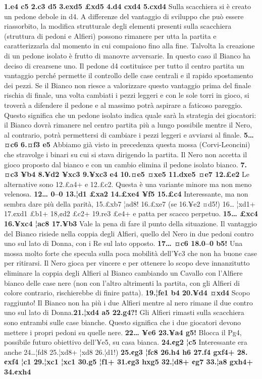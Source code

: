 \textbf{1.e4 c5 2.c3 d5 3.exd5 £xd5 4.d4 cxd4 5.cxd4} Sulla scacchiera
si è creato un pedone debole in d4. A differenze del vantaggio di
sviluppo che può essere riassorbito, la modifica strutturale degli
elementi presenti sulla scacchiera (struttura di pedoni e Alfieri)
possono rimanere per utta la partita e caratterizzarla dal momento in
cui compaiono fino alla fine. Talvolta la creazione di un pedone isolato
è frutto di manovre avversarie. In questo caso il Bianco ha deciso di
crearsene uno. Il pedone d4 costituisce per tutto il centro partita un
vantaggio perché permette il controllo delle case centrali e il rapido
spostamento dei pezzi. Se il Bianco non riesce a valorizzare questo
vantaggio prima del finale rischia di finale, una volta cambiati i pezzi
leggeri e con le sole torri in gioco, si troverà a difendere il pedone e
al massimo potrà aspirare a faticoso pareggio. Questo significa che un
pedone isolato indica quale sarà la strategia dei giocatori: il Bianco
dovrà rimanere nel centro partita più a lungo possibile mentre il Nero,
al contrario, potrà permettersi di cambiare i pezzi leggeri e avviarsi
al finale. \textbf{5\ldots ¤c6 6.¤f3 e5} Abbiamo già visto in precedenza
questa mossa (Corvi-Leoncini) che stravolge i binari su cui si stava
dirigendo la partita. Il Nero non accetta il gioco proposto dal bianco e
con un cambio elimina il pedone isolato bianco. \textbf{7.¤c3 ¥b4 8.¥d2
¥xc3 9.¥xc3 e4 10.¤e5 ¤xe5 11.dxe5 ¤e7 12.£e2} Le alternative sono
12.£a4+ e 12.£c2. Questa è una variante minore ma non meno velenosa.
\textbf{12\ldots{} 0--0 13.¦d1 £xa2 14.£xe4 ¥f5 15.£c4} Interessante, ma
non sembra dare più della parità, 15.£xb7 ¦ad8! 16.£xe7 (se 16.¥e2 ¤d5!)
16\ldots{} ¦xd1+ 17.¢xd1 £b1+ 18,¢d2 £c2+ 19.re3 £e4+ e patta per scacco
perpetuo. \textbf{15\ldots{} £xc4 16.¥xc4 ¦ac8 17.¥b3} Vale la pena di
fare il punto della situazione. Il vantaggio del Bianco risiede nella
coppia degli Alfieri, quello del Nero in due pedoni contro uno sul lato
di Donna, con i Re sul lato opposto. \textbf{17\ldots{} ¤c6 18.0--0 b5!}
Una mossa molto forte che specula sulla poca mobilità dell'¥c3 che non
ha buone case per ritirarsi. Il Nero gioca per vincere e per ottenere lo
scopo deve innanzitutto eliminare la coppia degli Alfieri al Bianco
cambiando un Cavallo con l'Alfiere bianco delle case nere (non con
l'altro altrimenti la partita, con gli Alfieri di colore contrario,
rischierebbe di finire patta). \textbf{19.¦fe1 b4 20.¥d4 ¤xd4} Scopo
raggiunto! Il Bianco non ha più i due Alfieri mentre al nero rimane il
due contro uno sul lato di Donna.\textbf{21.¦xd4 a5 22.g4?!} Gli Alfieri
rimasti sulla scacchiera sono entrambi sulle case bianche. Questo
significa che i due giocatori devono mettere i propri pedoni su quelle
nere. \textbf{22\ldots{} ¥e6 23.¥a4 g5!} Blocca il Pg4, possibile futuro
obiettivo dell'¥e5, su casa bianca. \textbf{24.¢g2 ¦c5} Interessante era
anche 24\ldots ¦fd8 25.¦xd8+ ¦xd8 26.¦d1!) \textbf{25.¢g3 ¦fc8 26.h4 h6
27.f4 gxf4+ 28.¢xf4 ¦c1 29.¦xc1 ¦xc1 30.g5 ¦f1+ 31.¢g3 hxg5 32.¦d8+ ¢g7
33.¦a8 gxh4+ 34.¢xh4}

